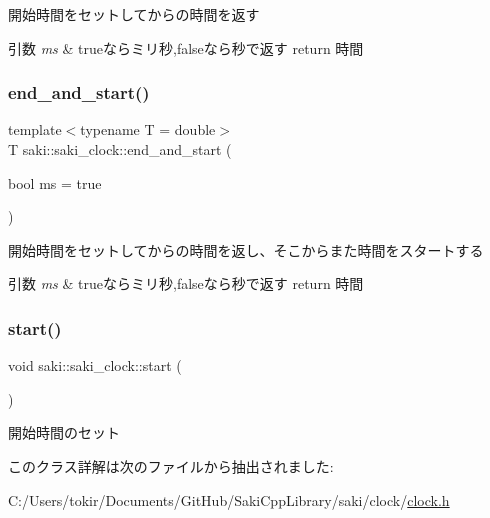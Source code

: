 開始時間をセットしてからの時間を返す 


\begin{DoxyParams}{引数}
{\em ms} & trueならミリ秒,falseなら秒で返す return 時間 \\
\hline
\end{DoxyParams}
\mbox{\label{classsaki_1_1saki__clock_a6fc6b2cd9a93b18af5583527398842ff}} 
\subsubsection{\texorpdfstring{end\+\_\+and\+\_\+start()}{end\_and\_start()}}
{\footnotesize\ttfamily template$<$typename T  = double$>$ \\
T saki\+::saki\+\_\+clock\+::end\+\_\+and\+\_\+start (\begin{DoxyParamCaption}\item[{bool}]{ms = {\ttfamily true} }\end{DoxyParamCaption})\hspace{0.3cm}{\ttfamily [inline]}}



開始時間をセットしてからの時間を返し、そこからまた時間をスタートする 


\begin{DoxyParams}{引数}
{\em ms} & trueならミリ秒,falseなら秒で返す return 時間 \\
\hline
\end{DoxyParams}
\mbox{\label{classsaki_1_1saki__clock_a685752d05d2611be4a8d2d2e0eb925c5}} 
\subsubsection{\texorpdfstring{start()}{start()}}
{\footnotesize\ttfamily void saki\+::saki\+\_\+clock\+::start (\begin{DoxyParamCaption}{ }\end{DoxyParamCaption})\hspace{0.3cm}{\ttfamily [inline]}}



開始時間のセット 



このクラス詳解は次のファイルから抽出されました\+:\begin{DoxyCompactItemize}
\item 
C\+:/\+Users/tokir/\+Documents/\+Git\+Hub/\+Saki\+Cpp\+Library/saki/clock/\mbox{\hyperlink{clock_8h}{clock.\+h}}\end{DoxyCompactItemize}
